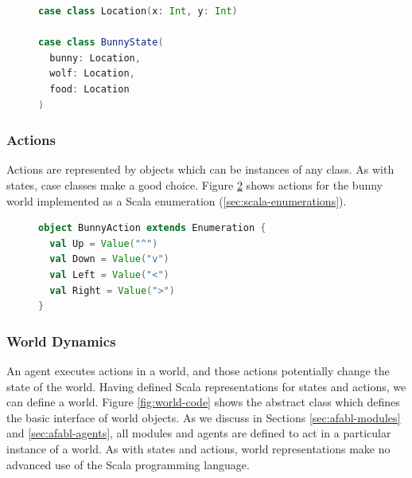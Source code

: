 \begin{figure}[ht]
\begin{center}

\begin{lstlisting}[language=Scala]
case class Location(x: Int, y: Int)

case class BunnyState(
  bunny: Location,
  wolf: Location,
  food: Location
)
\end{lstlisting}

\caption{}
\end{center}
\label{fig:bunny-state-code}
\end{figure}

\subsubsection{Actions}

Actions are represented by objects which can be instances of any class. As with states, case classes make a good choice. Figure \ref{fig:bunny-action-code} shows actions for the bunny world implemented as a Scala enumeration (\ref{sec:scala-enumerations}).

\begin{figure}[ht]
\begin{center}

\begin{lstlisting}[language=Scala]
object BunnyAction extends Enumeration {
  val Up = Value("^")
  val Down = Value("v")
  val Left = Value("<")
  val Right = Value(">")
}
\end{lstlisting}

\caption{}
\end{center}
\label{fig:bunny-action-code}
\end{figure}

\subsubsection{World Dynamics}

An agent executes actions in a world, and those actions potentially change the state of the world. Having defined Scala representations for states and actions, we can define a world. Figure \ref{fig:world-code} shows the abstract class which defines the basic interface of world objects. As we discuss in Sections \ref{sec:afabl-modules} and \ref{sec:afabl-agents}, all modules and agents are defined to act in a particular instance of a world. As with states and actions, world representations make no advanced use of the Scala programming language.

